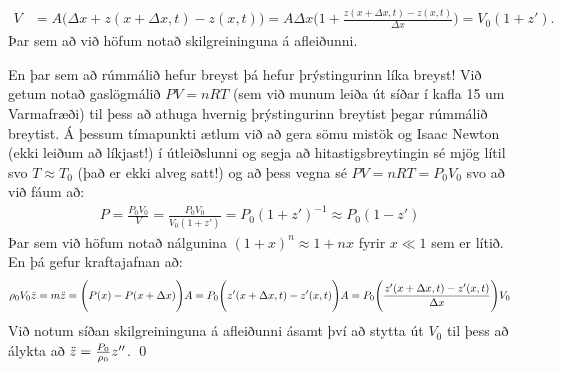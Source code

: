 \begin{align*}
    V &= A\Bigg( \Delta x + z(x+\Delta x,t) - z(x,t) \Bigg) = A \Delta x \Bigg( 1 + \frac{z(x+\Delta x,t)-z(x,t)}{\Delta x} \Bigg) = V_0 \left(1 + z'\right).
\end{align*}
Þar sem að við höfum notað skilgreininguna á afleiðunni.

En þar sem að rúmmálið hefur breyst þá hefur þrýstingurinn líka breyst! Við getum notað gaslögmálið $PV = nRT$ (sem við munum leiða út síðar í kafla 15 um Varmafræði) til þess að athuga hvernig þrýstingurinn breytist þegar rúmmálið breytist. Á þessum tímapunkti ætlum við að gera sömu mistök og Isaac Newton (ekki leiðum að líkjast!) í útleiðslunni og segja að hitastigsbreytingin sé mjög lítil svo $T \approx T_0$ (það er ekki alveg satt!) og að þess vegna sé $PV = nRT = P_0 V_0$ svo að við fáum að:
\begin{align*}
    P = \frac{P_0 V_0}{V} = \frac{P_0 V_0}{V_0 ( 1+ z')} = P_0 \left( 1 + z' \right)^{-1} \approx P_0(1 - z')
\end{align*}
Þar sem við höfum notað nálgunina $(1+x)^n \approx 1 + nx$ fyrir $x \ll 1$ sem er lítið. En þá gefur kraftajafnan að:
\begin{align*}
    \rho_0 V_0 \Ddot{z} = m \Ddot{z} =  \Bigg(P(x)-P(x+\Delta x)\Bigg)A = P_0\Bigg( z'(x+\Delta x,t) - z'(x,t) \Bigg)A = P_0\Bigg( \frac{z'(x+\Delta x, t)-z'(x,t)}{\Delta x} \Bigg) V_0
\end{align*}
Við notum síðan skilgreininguna á afleiðunni ásamt því að stytta út $V_0$ til þess að álykta að $\Ddot{z} = \frac{P_0}{\rho_0} z''$.
\qed 

\vspace{0.5cm}

